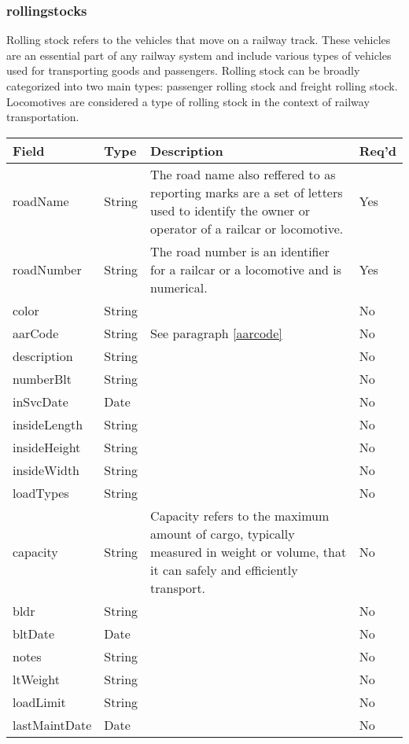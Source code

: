 \subsubsection{rollingstocks}
Rolling stock refers to the vehicles that move on a railway track. These vehicles are an essential part of any railway system and include various types of vehicles used for transporting goods and passengers. Rolling stock can be broadly categorized into two main types: passenger rolling stock and freight rolling stock. Locomotives are considered a type of rolling stock in the context of railway transportation.
\begin{table}[H]
    \begin{tabular}{|L{3cm}|L{1.7cm}|L{8.8cm}|L{1.3cm}|}
    \hline
        \textbf{Field} & \textbf{Type} & \textbf{Description} & \textbf{Req'd} \\ \hline
	roadName & String & The road name also reffered to as reporting marks are a set of letters used to identify the owner or operator of a railcar or locomotive. & Yes \\ \hline
	roadNumber & String & The road number is an identifier for a railcar or a locomotive and is numerical. & Yes \\ \hline
	color & String &  & No \\ \hline
	aarCode & String & See paragraph \ref{aarcode}  & No \\ \hline
	description & String &  & No \\ \hline
	numberBlt & String &  & No \\ \hline
	inSvcDate & Date &  & No \\ \hline
	insideLength & String &  & No \\ \hline
	insideHeight & String &  & No \\ \hline
	insideWidth & String &  & No \\ \hline
	loadTypes & String &  & No \\ \hline
	capacity & String & Capacity refers to the maximum amount of cargo, typically measured in weight or volume, that it can safely and efficiently transport. & No \\ \hline
	bldr & String &  & No \\ \hline
	bltDate & Date &  & No \\ \hline
	notes & String &  & No \\ \hline
	ltWeight & String &  & No \\ \hline
	loadLimit & String &  & No \\ \hline
	lastMaintDate & Date &  & No \\ \hline

\end{tabular}
\end{table}
